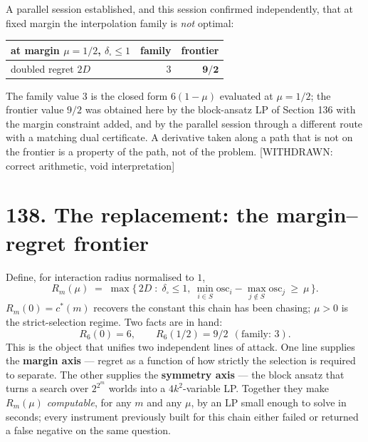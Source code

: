 \documentclass[9pt,twocolumn]{article}
\newcommand{\eclass}[1]{\textsf{[#1]}}
\renewcommand{\_}{\CIGunderscore\allowbreak}
\begin{document}
A parallel session established, and this session confirmed independently, that at fixed margin the interpolation family is \emph{not} optimal:
\begin{center}\scriptsize
\begin{tabularx}{0.98\columnwidth}{X r r}
\toprule
at margin $\mu=1/2$, $\delta_\square\le1$ & family & frontier\\
\midrule
doubled regret $2D$ & $3$ & $\mathbf{9/2}$\\
\bottomrule
\end{tabularx}
\end{center}
The family value $3$ is the closed form $6(1-\mu)$ evaluated at $\mu=1/2$; the frontier value $9/2$ was obtained here by the block-ansatz LP of Section 136 with the margin constraint added, and by the parallel session through a different route with a matching dual certificate. A derivative taken along a path that is not on the frontier is a property of the path, not of the problem. \eclass{WITHDRAWN: correct arithmetic, void interpretation}

\section*{138. The replacement: the margin--regret frontier}
Define, for interaction radius normalised to $1$,
\[R_m(\mu)\;=\;\max\bigl\{\,2D \;:\; \delta_\square\le1,\ \min_{i\in S}\mathrm{osc}_i-\max_{j\notin S}\mathrm{osc}_j\ \ge\ \mu\,\bigr\}.\]
$R_m(0)=c^\ast(m)$ recovers the constant this chain has been chasing; $\mu>0$ is the strict-selection regime. Two facts are in hand:
\[R_6(0)=6,\qquad R_6(1/2)=9/2\ \ (\text{family: }3).\]
This is the object that unifies two independent lines of attack. One line supplies the \textbf{margin axis} --- regret as a function of how strictly the selection is required to separate. The other supplies the \textbf{symmetry axis} --- the block ansatz that turns a search over $2^{2^m}$ worlds into a $4k^2$-variable LP. Together they make $R_m(\mu)$ \emph{computable}, for any $m$ and any $\mu$, by an LP small enough to solve in seconds; every instrument previously built for this chain either failed or returned a false negative on the same question.
\end{document}
